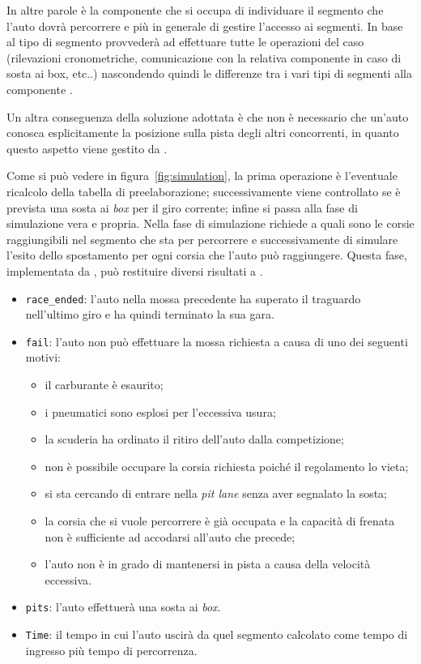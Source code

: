 In altre parole è la componente \track{} che si occupa di individuare il segmento che l'auto dovrà percorrere e più in generale di gestire l'accesso ai segmenti. In base al tipo di segmento \track{} provvederà ad effettuare tutte le operazioni del caso (rilevazioni cronometriche, comunicazione con la relativa componente \team{} in caso di sosta ai box, etc..) nascondendo quindi le differenze tra i vari tipi di segmenti alla componente \car{}.

Un altra conseguenza della soluzione adottata è che non è necessario che un'auto conosca esplicitamente la posizione sulla pista degli altri concorrenti, in quanto questo aspetto viene gestito da \track{}.


Come si può vedere in figura~\ref{fig:simulation}, la prima operazione è l'eventuale ricalcolo della tabella di preelaborazione; successivamente viene controllato se è prevista una sosta ai \textit{box} per il giro corrente; infine si passa alla fase di simulazione vera e propria. Nella fase di simulazione \car{} richiede a \track{} quali sono le corsie raggiungibili nel segmento che sta per percorrere e successivamente di simulare l'esito dello spostamento per ogni corsia che l'auto può raggiungere. Questa fase, implementata da , può restituire diversi risultati a \car{}.
\begin{itemize}
\item \texttt{race\_ended}: l'auto nella mossa precedente ha superato il traguardo nell'ultimo giro e ha quindi terminato la sua gara.
\item \texttt{fail}: l'auto non può effettuare la mossa richiesta a causa di uno dei seguenti motivi:
        \begin{itemize}
        \item il carburante è esaurito;
        \item i pneumatici sono esplosi per l'eccessiva usura;
        \item la scuderia ha ordinato il ritiro dell'auto dalla competizione;
        \item non è possibile occupare la corsia richiesta poiché il regolamento lo vieta;
        \item si sta cercando di entrare nella \textit{pit lane} senza aver segnalato la sosta;
        \item la corsia che si vuole percorrere è già occupata e la capacità di frenata non è sufficiente ad accodarsi all'auto che precede;
        \item l'auto non è in grado di mantenersi in pista a causa della velocità eccessiva.
        \end{itemize}
\item \texttt{pits}: l'auto effettuerà una sosta ai \textit{box}.
\item \texttt{Time}: il tempo in cui l'auto uscirà da quel segmento calcolato come tempo di ingresso più tempo di percorrenza.
\end{itemize}
